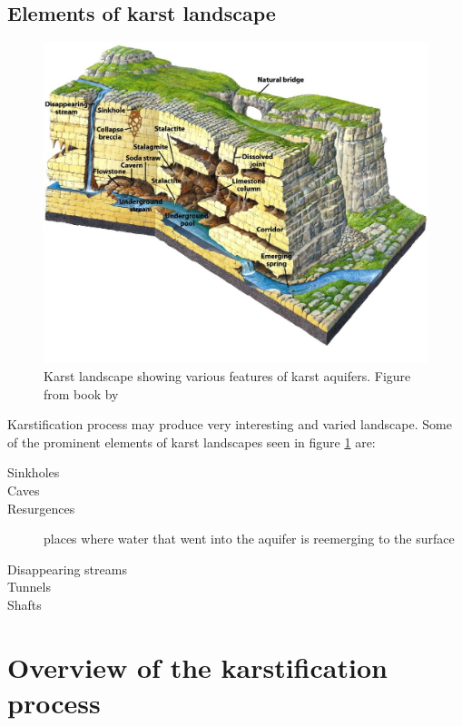 \subsection{Elements of karst landscape}

\begin{figure}
  \centerline{\includegraphics[width=\textwidth]{chapters/karstification/karst_landscape.jpg}}
  \caption{Karst landscape showing various features of karst aquifers.
    Figure from book by \cite{marshak2006}}
  \label{fig:karstlandscape}
\end{figure}


Karstification process may produce very interesting and varied landscape. Some
of the prominent elements of karst landscapes seen in figure \ref{fig:karstlandscape}
are:

\begin{description}
  \item[Sinkholes]
  \item[Caves]
  \item[Resurgences]
    places where water that went into the aquifer is reemerging to the surface
  \item[Disappearing streams]
  \item[Tunnels]
  \item[Shafts]
\end{description}

\section{Overview of the karstification process}

